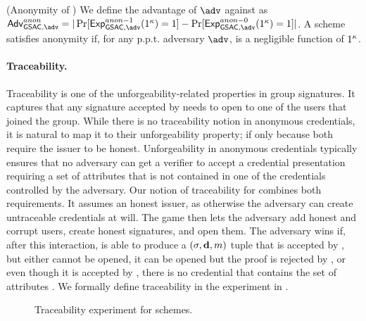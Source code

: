 \begin{definition}{(Anonymity of \GSAC)}
  \label{def:anonymity-gsac}
  We define the advantage \AdvGSACAnon of $\adv$ against \ExpGSACAnonb as
  $\AdvGSACAnon=|\Pr\lbrack\ExpGSACAnono(1^\secpar)=1\rbrack-
  \Pr\lbrack\ExpGSACAnonz(1^\secpar)=1\rbrack|$.
  A \GSAC scheme satisfies anonymity if, for any p.p.t. adversary $\adv$,
  \AdvAnon is a negligible function of $1^\kappa$.
\end{definition}

\paragraph{Traceability.} %
Traceability is one of the unforgeability-related properties in group
signatures. It captures that any signature accepted by \Verify needs to open
to one of the users that joined the group. While there is no traceability notion
in anonymous credentials, it is natural to map it to their unforgeability
property; if only because both require the issuer to be honest. Unforgeability
in anonymous credentials typically ensures that no adversary can get a verifier
to accept a credential presentation requiring a set of attributes that is not
contained in one of the credentials controlled by the adversary.
%
Our notion of traceability for \GSAC combines both requirements. It assumes an
honest issuer, as otherwise the adversary can create untraceable credentials at
will. The game then lets the adversary add honest and corrupt users, create
honest signatures, and open them. The adversary wins if, after this interaction,
is able to produce a $(\sigma,\mathbf{d},m)$ tuple that is accepted by \Verify,
but either cannot be opened, it can be opened but the proof is rejected by
\Judge, or even though it is accepted by \Judge, there is no credential
that contains the set of attributes \dattrs. We formally define traceability in
the \ExpTrace experiment in .

\begin{figure}[htp!]
  \caption{Traceability experiment for \GSAC schemes.}
  \label{fig:exp-gsac-trace}
\end{figure}

